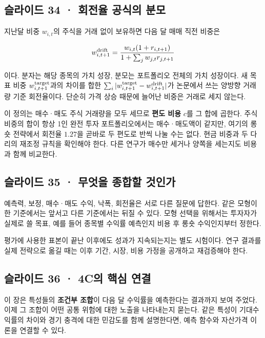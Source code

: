 \documentclass[11pt,a4paper]{article}
\begin{document}
\subsection{슬라이드 34 · 회전율 공식의 분모}
지난달 비중 $w_{i,t}$의 주식을 거래 없이 보유하면 다음 달 매매 직전 비중은\par

\[
w^{\rm drift}_{i,t+1}=\frac{w_{i,t}(1+r_{i,t+1})}{1+\sum_jw_{j,t}r_{j,t+1}}
\]

이다. 분자는 해당 종목의 가치 성장, 분모는 포트폴리오 전체의 가치 성장이다. 새 목표 비중 $w^{\rm target}_{i,t+1}$과의 차이를 합한 $\sum_i|w^{\rm target}_{i,t+1}-w^{\rm drift}_{i,t+1}|$가 논문에서 쓰는 양방향 거래량 기준 회전율이다. 단순히 가격 상승 때문에 늘어난 비중은 거래로 세지 않는다.\par

이 정의는 매수·매도 주식 거래량을 모두 세므로 \textbf{편도 비용} $c$를 그 합에 곱한다. 주식 비중의 합이 항상 1인 완전 투자 포트폴리오에서는 매수·매도액이 같지만, 여기의 롱숏 전략에서 회전율 $1.27$을 곧바로 두 편도로 반씩 나눌 수는 없다. 현금 비중과 두 다리의 재조정 규칙을 확인해야 한다. 다른 연구가 매수만 세거나 양쪽을 세는지도 비용과 함께 비교한다.\par

\subsection{슬라이드 35 · 무엇을 종합할 것인가}
예측력, 보정, 매수·매도 수익, 낙폭, 회전율은 서로 다른 질문에 답한다. 같은 모형이 한 기준에서는 앞서고 다른 기준에서는 뒤질 수 있다. 모형 선택을 위해서는 투자자가 실제로 쓸 목표, 예를 들어 종목별 수익률 예측인지 비용 후 롱숏 수익인지부터 정한다.\par

평가에 사용한 표본이 끝난 이후에도 성과가 지속되는지는 별도 시험이다. 연구 결과를 실제 전략으로 옮길 때는 이후 기간, 시장, 비용 가정을 공개하고 재검증해야 한다.\par

\subsection{슬라이드 36 · 4C의 핵심 연결}
이 장은 특성들의 \textbf{조건부 조합}이 다음 달 수익률을 예측한다는 결과까지 보여 주었다. 이제 그 조합이 어떤 공통 위험에 대한 노출을 나타내는지 묻는다. 같은 특성이 기대수익률의 차이와 경기 충격에 대한 민감도를 함께 설명한다면, 예측 함수와 자산가격 이론을 연결할 수 있다.\par
\end{document}
